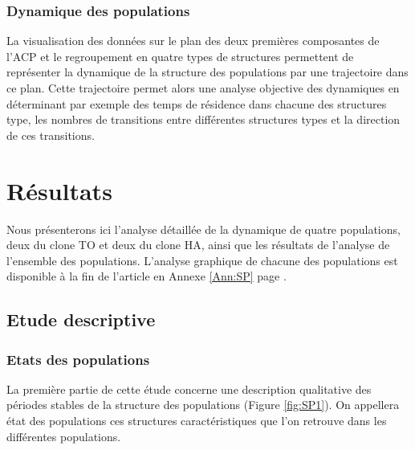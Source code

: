 \subsubsection{Dynamique des populations}

La visualisation des données sur le plan des deux premières composantes de l'ACP
et le regroupement en quatre types de structures permettent de représenter la
dynamique de la structure des populations par une trajectoire dans ce plan.
Cette trajectoire permet alors une analyse objective des dynamiques en
déterminant par exemple des temps de résidence dans chacune des structures type,
les nombres de transitions entre différentes structures types et la direction de
ces transitions. 

\section{Résultats}

Nous présenterons ici l'analyse détaillée de la dynamique de quatre populations,
deux du clone TO et deux du clone HA, ainsi que les résultats de l'analyse de l'ensemble des
populations. L'analyse graphique de chacune des populations est disponible à la
fin de l'article en Annexe \ref{Ann:SP} page \pageref{Ann:SP}. 

\subsection{Etude descriptive}

\subsubsection{Etats des populations}

La première partie de cette étude concerne une description qualitative des
périodes stables de la structure des populations (Figure \ref{fig:SP1}). On
appellera état des populations ces structures caractéristiques que l'on retrouve dans les
différentes populations. 

